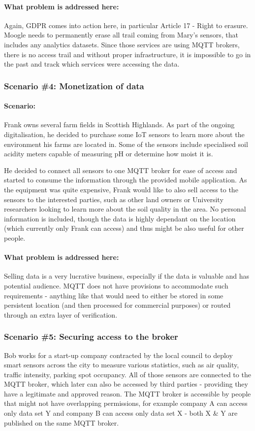 \paragraph{\textbf{What problem is addressed here:}}
Again, GDPR comes into action here, in particular Article 17 - Right to erasure. Moogle needs to permanently erase all trail coming from Mary's sensors, that includes any analytics datasets. Since those services are using MQTT brokers, there is no access trail and without proper infrastructure, it is impossible to go in the past and track which services were accessing the data.
\\
\subsubsection{Scenario \#4: Monetization of data}
\paragraph{\textbf{Scenario:}}
Frank owns several farm fields in Scottish Highlands. As part of the ongoing digitalisation, he decided to purchase some IoT sensors to learn more about the environment his farms are located in. Some of the sensors include specialised soil acidity meters capable of measuring pH or determine how moist it is.

He decided to connect all sensors to one MQTT broker for ease of access and started to consume the information through the provided mobile application. As the equipment was quite expensive, Frank would like to also sell access to the sensors to the interested parties, such as other land owners or University researchers looking to learn more about the soil quality in the area. No personal information is included, though the data is highly dependant on the location (which currently only Frank can access) and thus might be also useful for other people. 
\paragraph{\textbf{What problem is addressed here:}}
Selling data is a very lucrative business, especially if the data is valuable and has potential audience. MQTT does not have provisions to accommodate such requirements - anything like that would need to either be stored in some persistent location (and then processed for commercial purposes) or routed through an extra layer of verification.
\\
\subsubsection{Scenario \#5: Securing access to the broker}
Bob works for a start-up company contracted by the local council to deploy smart sensors across the city to measure various statistics, such as air quality, traffic intensity, parking spot occupancy. All of those sensors are connected to the MQTT broker, which later can also be accessed by third parties - providing they have a legitimate and approved reason. The MQTT broker is accessible by people that might not have overlapping permissions, for example company A can access only data set Y and company B can access only data set X - both X \& Y are published on the same MQTT broker.

